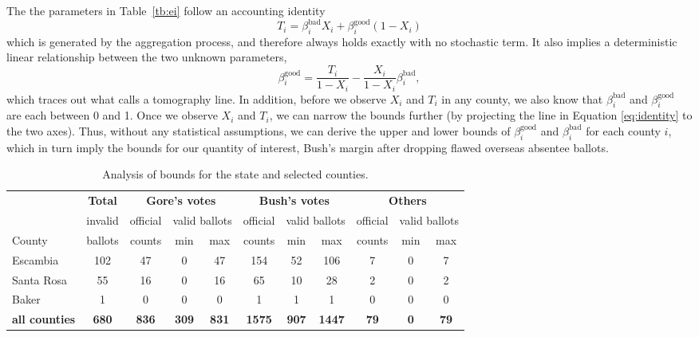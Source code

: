 \documentclass[11pt,titlepage]{article}
\newcommand{\bb}{\beta^{\text{bad}}}
\newcommand{\bg}{\beta^{\text{good}}}
\begin{document}
The the parameters in Table~\ref{tb:ei} follow an accounting identity
\begin{equation} \label{eq:gid}
  T_i=\bb_i X_i+\bg_i (1-X_i)
\end{equation} 
which is generated by the aggregation process, and therefore always
holds exactly with no stochastic term. It also implies a deterministic
linear relationship between the two unknown parameters,
\begin{equation} \label{eq:identity}
\bg_i = \frac{T_i}{1-X_i}-\frac{X_i}{1-X_i}\bb_i,
\end{equation}
which traces out what \citet{king:97} calls a tomography line.  In
addition, before we observe $X_i$ and $T_i$ in any county, we also
know that $\bb_i$ and $\bg_i$ are each between 0 and 1.  Once we
observe $X_i$ and $T_i$, we can narrow the bounds further (by
projecting the line in Equation \ref{eq:identity} to the two axes).
Thus, without any statistical assumptions, we can derive the upper and
lower bounds of $\bg_i$ and $\bb_i$ for each county $i$, which in turn
imply the bounds for our quantity of interest, Bush's margin after
dropping flawed overseas absentee ballots.
\begin{table}[t]
\begin{center}
\begin{tabular}{l c |ccc|ccc|ccc}
    & \bf Total & \multicolumn{3}{c|}{\bf Gore's votes} &
  \multicolumn{3}{c|}{\bf Bush's votes} &
  \multicolumn{3}{c}{\bf Others} \\
  & invalid & official & \multicolumn{2}{c|}{valid ballots} & official &
  \multicolumn{2}{c|}{valid ballots} & official &
  \multicolumn{2}{c}{valid ballots} \\
County & ballots & counts & min & max & counts & min & max & counts &
  min & max\\
\hline 
Escambia   & 102 & 47 & 0 & 47 & 154 & 52 & 106 & 7 & 0 & 7 \\
Santa Rosa &  55 & 16 & 0 & 16 &  65 & 10 &  28 & 2 & 0 & 2 \\
Baker      &  1  &  0 & 0 &  0 &   1 &  1 &   1 & 0 & 0 & 0 \\
\hline
\bf all counties & \bf 680 & \bf 836 & \bf 309 & \bf 831 & \bf 1575 &
  \bf 907 & \bf 1447 & \bf 79 & \bf 0 & \bf 79 \\ 
\end{tabular} \caption{Analysis of bounds for the state  and 
  selected counties.}\label{tb:bounds}
\end{center}
\end{table} 
\end{document}
